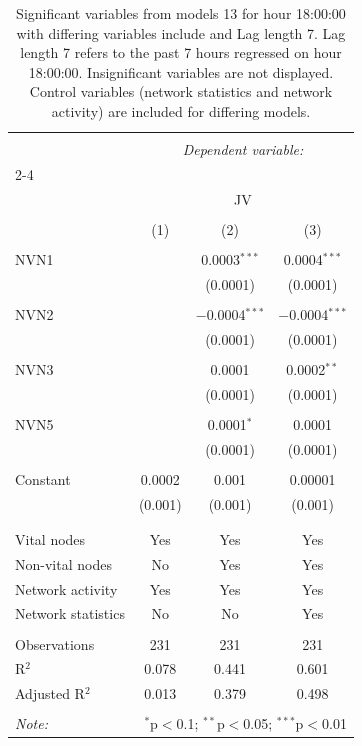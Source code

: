 
\begin{table}[!htbp] \centering 
  \caption{Significant variables from models 13 for hour 18:00:00 with differing variables include 
                               and Lag length 7. Lag length 7 refers to the past 7 hours regressed on hour 18:00:00. 
                               Insignificant variables are not displayed. 
                               Control variables (network statistics and network activity) are 
                               included for differing models.} 
  \label{Jmodels2_t_hourlagged5} 
\scriptsize 
\begin{tabular}{@{\extracolsep{5pt}}lccc} 
\\[-1.8ex]\hline 
\hline \\[-1.8ex] 
 & \multicolumn{3}{c}{\textit{Dependent variable:}} \\ 
\cline{2-4} 
\\[-1.8ex] & \multicolumn{3}{c}{JV} \\ 
\\[-1.8ex] & (1) & (2) & (3)\\ 
\hline \\[-1.8ex] 
 NVN1 &  & 0.0003$^{***}$ & 0.0004$^{***}$ \\ 
  &  & (0.0001) & (0.0001) \\ 
  & & & \\ 
 NVN2 &  & $-$0.0004$^{***}$ & $-$0.0004$^{***}$ \\ 
  &  & (0.0001) & (0.0001) \\ 
  & & & \\ 
 NVN3 &  & 0.0001 & 0.0002$^{**}$ \\ 
  &  & (0.0001) & (0.0001) \\ 
  & & & \\ 
 NVN5 &  & 0.0001$^{*}$ & 0.0001 \\ 
  &  & (0.0001) & (0.0001) \\ 
  & & & \\ 
 Constant & 0.0002 & 0.001 & 0.00001 \\ 
  & (0.001) & (0.001) & (0.001) \\ 
  & & & \\ 
\hline \\[-1.8ex] 
Vital nodes & Yes & Yes & Yes \\ 
Non-vital nodes & No & Yes & Yes \\ 
Network activity & Yes & Yes & Yes \\ 
Network statistics & No & No & Yes \\ 
\hline &  &  &  \\ 
Observations & 231 & 231 & 231 \\ 
R$^{2}$ & 0.078 & 0.441 & 0.601 \\ 
Adjusted R$^{2}$ & 0.013 & 0.379 & 0.498 \\ 
\hline 
\hline \\[-1.8ex] 
\textit{Note:}  & \multicolumn{3}{r}{$^{*}$p$<$0.1; $^{**}$p$<$0.05; $^{***}$p$<$0.01} \\ 
\end{tabular} 
\end{table} 
